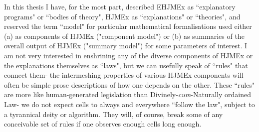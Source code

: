 In this thesis I have, for the most part, described EHJMEx as ``explanatory programs" or ``bodies of theory", HJMEx as ``explanations" or ``theories", and reserved the term ``model" for particular mathematical formalisations used either (a) as components of HJMEx ("component model") or (b) as summaries of the overall output of HJMEx ("summary model") for some parameters of interest. I am not very interested in enshrining any of the diverse components of HJMEx or the explanations themselves as ``laws", but we can usefully speak of ``rules" that connect them- the intermeshing properties of various HJMEx components will often be simple prose descriptions of how one depends on the other. These ``rules" are more like human-generated legislation than Divinely-\textit{cum}-Naturally ordained Law- we do not expect cells to always and everywhere ``follow the law", subject to a tyrannical deity or algorithm. They will, of course, break some of any conceivable set of rules if one observes enough cells long enough.


